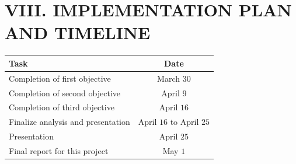 \documentclass[letterpaper]{article}
\begin{document}
\section{VIII. IMPLEMENTATION PLAN AND TIMELINE}

\begin{center}
\begin{tabular}{ | l | c | } 
\hline
\textbf{Task} & \textbf{Date} \\ 
\hline
Completion of first objective &  March $30$ \\ 
\hline
Completion of second objective & April $9$ \\ 
\hline
Completion of third objective & April $16$ \\ 
 \hline
Finalize analysis and presentation & April $16$ to April $25$ \\ 
\hline
Presentation & April $25$ \\
\hline
Final report for this project & May $1$ \\ 
\hline
\end{tabular}
\end{center}

\footnotesize


\end{document}
